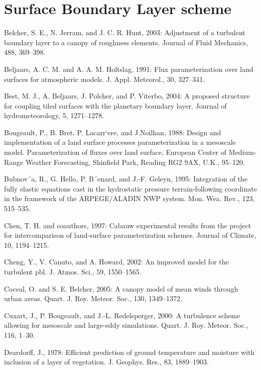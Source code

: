 \section{Surface Boundary Layer scheme}
\begin{description}

\item
Belcher, S. E., N. Jerram, and J. C. R. Hunt, 2003: Adjustment of a turbulent boundary layer to
a canopy of roughness elements. Journal of Fluid Mechanics, 488, 369–398.
\item
Beljaars, A. C. M. and A. A. M. Holtslag, 1991: Flux parameterization over land surfaces for
atmospheric models. J. Appl. Meteorol., 30, 327–341.
\item
Best, M. J., A. Beljaars, J. Polcher, and P. Viterbo, 2004: A proposed structure for coupling tiled
surfaces with the planetary boundary layer. Journal of hydrometeorology, 5, 1271–1278.
\item
Bougeault, P., B. Bret, P. Lacarr`ere, and J.Noilhan, 1988: Design and implementation of a
land surface processes parameterization in a mesoscale model. Parameterization of fluxes
over land surface, European Center of Medium-Range Weather Forecasting, Shinfield Park,
Reading RG2 9AX, U.K., 95–120.
\item
Bubnov´a, R., G. Hello, P. B´enard, and J.-F. Geleyn, 1995: Integration of the fully elastic equations
cast in the hydrostatic pressure terrain-following coordinate in the framework of the
ARPEGE/ALADIN NWP system. Mon. Wea. Rev., 123, 515–535.
\item
Chen, T. H. and coauthors, 1997: Cabauw experimental results from the project for intercomparison
of land-surface parameterization schemes. Journal of Climate, 10, 1194–1215.
\item
Cheng, Y., V. Canuto, and A. Howard, 2002: An improved model for the turbulent pbl. J. Atmos.
Sci., 59, 1550–1565.
\item
Coceal, O. and S. E. Belcher, 2005: A canopy model of mean winds through urban areas. Quart.
J. Roy. Meteor. Soc., 130, 1349–1372.
\item
Cuxart, J., P. Bougeault, and J.-L. Redelsperger, 2000: A turbulence scheme allowing for
mesoscale and large-eddy simulations. Quart. J. Roy. Meteor. Soc., 116, 1–30.
\item
Deardorff, J., 1978: Efficient prediction of ground temperature and moisture with inclusion of
a layer of vegetation. J. Geophys. Res., 83, 1889–1903.

\end{description}

